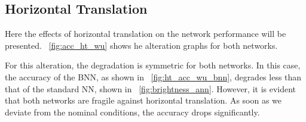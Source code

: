 \subsection{Horizontal Translation}

Here the effects of horizontal translation on the network performance will be presented. \Fig~\ref{fig:acc_ht_wu} shows he alteration graphs for both networks.

For this alteration, the degradation is symmetric for both networks. In this case, the accuracy of the BNN, as shown in \Fig~\ref{fig:ht_acc_wu_bnn}, degrades less than that of the standard NN, shown in \Fig~\ref{fig:brightness_ann}. However, it is evident that both networks are fragile against horizontal translation. As soon as we deviate from the nominal conditions, the accuracy drops significantly.

